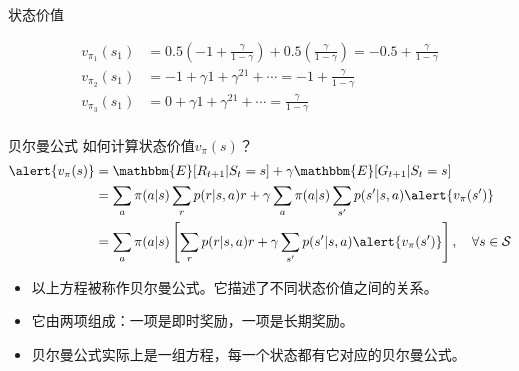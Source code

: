 \begin{frame}{状态价值}
\begin{center}
    \end{center}
    \[
        \begin{aligned}
            v_{\pi_1}(s_1)&=0.5\left(-1+\frac{\gamma}{1-\gamma}\right)+0.5\left(\frac{\gamma}{1-\gamma}\right) = -0.5+\frac{\gamma}{1-\gamma}\\
            v_{\pi_2}(s_1)&=-1+\gamma1+\gamma^21+\cdots=-1+\frac{\gamma}{1-\gamma}\\
            v_{\pi_3}(s_1)&=0+\gamma1+\gamma^21+\cdots=\frac{\gamma}{1-\gamma} \\            
        \end{aligned}
    \]
\end{frame}

\begin{frame}{贝尔曼公式}
    如何计算状态价值$v_{\pi}(s)$？
    \[
        \begin{aligned}
            \alert{v_\pi(s)}&=\mathbbm{E}[R_{t+1}|S_t=s]+\gamma\mathbbm{E}[G_{t+1}|S_t=s] \\
            &=\sum_a\pi(a|s)\sum_r p(r|s,a)r+\gamma\sum_a\pi(a|s)\sum_{s'}p(s'|s,a)\alert{v_{\pi}(s')} \\
            &=\sum_a\pi(a|s)\left[\sum_r p(r|s,a)r+\gamma\sum_{s'}p(s'|s,a)\alert{v_{\pi}(s')}\right], \quad \forall s\in\mathcal{S}
        \end{aligned}
    \]
    \begin{itemize}
        \item 以上方程被称作贝尔曼公式。它描述了不同状态价值之间的关系。
        \item 它由两项组成：一项是即时奖励，一项是长期奖励。
        \item 贝尔曼公式实际上是一组方程，每一个状态都有它对应的贝尔曼公式。
    \end{itemize}
\end{frame}

